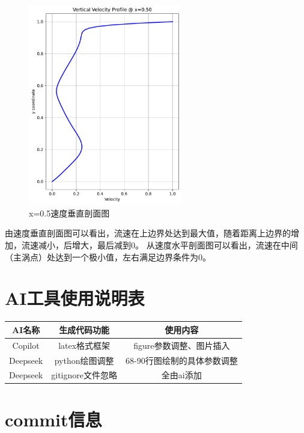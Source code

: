 \documentclass[12pt,a4paper]{article}
\begin{document}
\begin{figure}[H]
    \centering
    \includegraphics[width=0.6\textwidth]{3_vertical_profile.pdf}
    \caption{x=0.5速度垂直剖面图}
    \label{fig:velocity_profile}
\end{figure}
由速度垂直剖面图可以看出，流速在上边界处达到最大值，随着距离上边界的增加，流速减小，后增大，最后减到0。
从速度水平剖面图可以看出，流速在中间（主涡点）处达到一个极小值，左右满足边界条件为0。

\section{AI工具使用说明表}
\begin{table}[!htbp]
    \centering
    \begin{tabular}{|c|c|c|}
        \hline
        \textbf{AI名称} & \textbf{生成代码功能} & \textbf{使用内容} \\
        \hline
        Copilot & latex格式框架 & figure参数调整、图片插入\\
        \hline
        Deepseek & python绘图调整 & 68-90行图绘制的具体参数调整\\
        \hline
        Deepseek & gitignore文件忽略 & 全由ai添加\\
        \hline
\end{tabular}
\end{table}
\section{commit信息}
\end{document}
